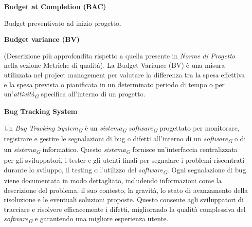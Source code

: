 \documentclass{article}
\begin{document}
\vspace{0.4cm}

\textbf{Budget at Completion (BAC)}

\vspace{0.1cm}

Budget preventivato ad inizio progetto.

\vspace{0.4cm}

\textbf{Budget variance (BV)}

\vspace{0.1cm}

(Descrizione più approfondita rispetto a quella presente in \textit{Norme di Progetto} nella sezione Metriche di qualità).
La Budget Variance (BV) è una misura utilizzata nel project management per valutare la differenza tra la spesa effettiva e la spesa prevista o pianificata in un determinato periodo di tempo o per un'\textit{attività}\textsubscript{\textit{G}} specifica all'interno di un progetto.

\vspace{0.4cm}

\vspace{0.4cm}

\textbf{Bug Tracking System}

\vspace{0.1cm}

Un \textit{Bug Tracking System}\textsubscript{\textit{G}} è un \textit{sistema}\textsubscript{\textit{G}} \textit{software}\textsubscript{\textit{G}} progettato per monitorare, registrare e gestire le segnalazioni di bug o difetti all'interno di un \textit{software}\textsubscript{\textit{G}} o di un \textit{sistema}\textsubscript{\textit{G}} informatico. Questo \textit{sistema}\textsubscript{\textit{G}} fornisce un'interfaccia centralizzata per gli sviluppatori, i tester e gli utenti finali per segnalare i problemi riscontrati durante lo sviluppo, il testing o l'utilizzo del \textit{software}\textsubscript{\textit{G}}. Ogni segnalazione di bug viene documentata in modo dettagliato, includendo informazioni come la descrizione del problema, il suo contesto, la gravità, lo stato di avanzamento della risoluzione e le eventuali soluzioni proposte. Questo consente agli sviluppatori di tracciare e risolvere efficacemente i difetti, migliorando la qualità complessiva del \textit{software}\textsubscript{\textit{G}} e garantendo una migliore esperienza utente.

\vspace{0.4cm}
\end{document}
